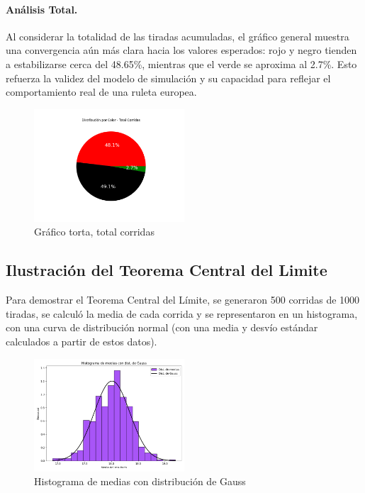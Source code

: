 \documentclass{article}
\begin{document}
\paragraph{Análisis Total.}
Al considerar la totalidad de las tiradas acumuladas, el gráfico general muestra una convergencia aún más clara hacia los valores esperados: rojo y negro tienden a estabilizarse cerca del 48.65\%, mientras que el verde se aproxima al 2.7\%. Esto refuerza la validez del modelo de simulación y su capacidad para reflejar el comportamiento real de una ruleta europea.
\begin{figure} [H]
    \centering
    \includegraphics[width=0.5\textwidth]{Imagenes/GraficoColorTotalCorridas.png}
    \caption{Gráfico torta, total corridas}
\end{figure}

\subsection{Ilustración del Teorema Central del Limite}
\par Para demostrar el Teorema Central del Límite, se generaron 500 corridas de 1000 tiradas, se calculó la media de cada corrida y se representaron en un histograma, con una curva de distribución normal (con una media y desvío estándar calculados a partir de estos datos).

\begin{figure} [H]
    \centering
    \includegraphics[width=0.5\textwidth]{Imagenes/Histograma_medias_gauss.png}
    \caption{Histograma de medias con distribución de Gauss}
\end{figure}
\end{document}
